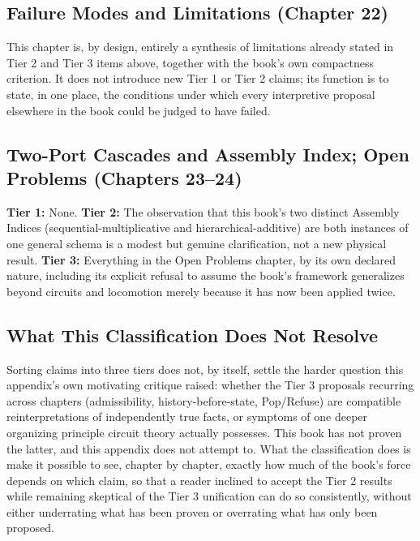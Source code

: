 \documentclass[12pt]{article}
\begin{document}
\subsection*{Failure Modes and Limitations (Chapter 22)}
This chapter is, by design, entirely a synthesis of limitations already stated in Tier 2 and Tier 3 items above, together with the book's own compactness criterion. It does not introduce new Tier 1 or Tier 2 claims; its function is to state, in one place, the conditions under which every interpretive proposal elsewhere in the book could be judged to have failed.

\subsection*{Two-Port Cascades and Assembly Index; Open Problems (Chapters 23--24)}
\textbf{Tier 1:} None.
\textbf{Tier 2:} The observation that this book's two distinct Assembly Indices (sequential-multiplicative and hierarchical-additive) are both instances of one general schema is a modest but genuine clarification, not a new physical result.
\textbf{Tier 3:} Everything in the Open Problems chapter, by its own declared nature, including its explicit refusal to assume the book's framework generalizes beyond circuits and locomotion merely because it has now been applied twice.

\subsection*{What This Classification Does Not Resolve}

Sorting claims into three tiers does not, by itself, settle the harder question this appendix's own motivating critique raised: whether the Tier 3 proposals recurring across chapters (admissibility, history-before-state, Pop/Refuse) are compatible reinterpretations of independently true facts, or symptoms of one deeper organizing principle circuit theory actually possesses. This book has not proven the latter, and this appendix does not attempt to. What the classification does is make it possible to see, chapter by chapter, exactly how much of the book's force depends on which claim, so that a reader inclined to accept the Tier 2 results while remaining skeptical of the Tier 3 unification can do so consistently, without either underrating what has been proven or overrating what has only been proposed.
\end{document}
